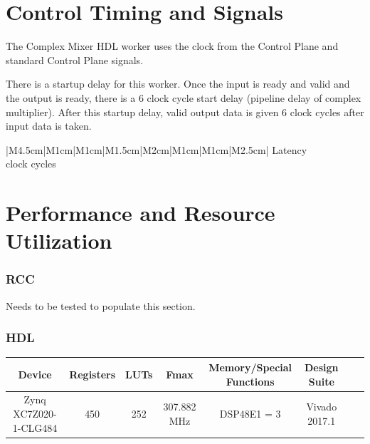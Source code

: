 \documentclass{article}
\begin{document}
\section*{Control Timing and Signals}
\begin{flushleft}
	The Complex Mixer HDL worker uses the clock from the Control Plane and standard Control Plane signals.\medskip

	There is a startup delay for this worker. Once the input is ready and valid and the output is ready, there is a 6 clock cycle start delay (pipeline delay of complex multiplier). After this startup delay, valid output data is given 6 clock cycles after input data is taken.

	\begin{tabular}{|M{4.5cm}|M{1cm}|M{1cm}|M{1.5cm}|M{2cm}|M{1cm}|M{1cm}|M{2.5cm}|}
		\hline
		Latency         \\
		 clock cycles  \\
		\hline
	\end{tabular}
\end{flushleft}

\section*{Performance and Resource Utilization}
	\subsubsection*{RCC}
	    Needs to be tested to populate this section.
	\subsubsection*{HDL}
		\begin{scriptsize}
		\begin{tabular}{|c|c|c|c|c|c|c|c|}
			\hline
			\rowcolor{blue}
			Device & Registers & LUTs & Fmax & Memory/Special Functions & Design Suite\\
			\hline
            Zynq XC7Z020-1-CLG484    & 450    & 252 & 307.882 MHz & DSP48E1 = 3 & Vivado 2017.1\\
			\hline
		\end{tabular}
		\end{scriptsize}
\end{document}
